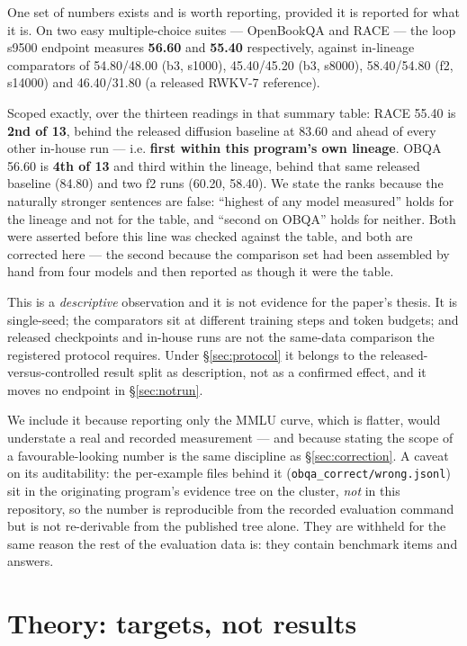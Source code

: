 \documentclass[11pt]{article}
\begin{document}
One set of numbers exists and is worth reporting, provided it is reported for what it
is. On two easy multiple-choice suites --- OpenBookQA and RACE --- the loop s9500
endpoint measures \textbf{56.60} and \textbf{55.40} respectively, against in-lineage
comparators of 54.80/48.00 (b3, s1000), 45.40/45.20 (b3, s8000), 58.40/54.80 (f2,
s14000) and 46.40/31.80 (a released RWKV-7 reference).

Scoped exactly, over the thirteen readings in that summary table: RACE 55.40 is
\textbf{2nd of 13}, behind the released diffusion baseline at 83.60 and ahead of every
other in-house run --- i.e. \textbf{first within this program's own lineage}. OBQA 56.60
is \textbf{4th of 13} and third within the lineage, behind that same released baseline
(84.80) and two f2 runs (60.20, 58.40). We state the ranks because the naturally
stronger sentences are false: ``highest of any model measured'' holds for the lineage
and not for the table, and ``second on OBQA'' holds for neither. Both were asserted
before this line was checked against the table, and both are corrected here --- the
second because the comparison set had been assembled by hand from four models and then
reported as though it were the table.

This is a \emph{descriptive} observation and it is not evidence for the paper's thesis.
It is single-seed; the comparators sit at different training steps and token budgets;
and released checkpoints and in-house runs are not the same-data comparison the
registered protocol requires. Under \S\ref{sec:protocol} it belongs to the
released-versus-controlled result split as description, not as a confirmed effect, and
it moves no endpoint in \S\ref{sec:notrun}.

We include it because reporting only the MMLU curve, which is flatter, would understate
a real and recorded measurement --- and because stating the scope of a favourable-looking
number is the same discipline as \S\ref{sec:correction}. A caveat on its auditability:
the per-example files behind it (\texttt{obqa\_correct/wrong.jsonl}) sit in the
originating program's evidence tree on the cluster, \emph{not} in this repository, so
the number is reproducible from the recorded evaluation command but is not re-derivable
from the published tree alone. They are withheld for the same reason the rest of the
evaluation data is: they contain benchmark items and answers.

\section{Theory: targets, not results}
\label{sec:theory}
\end{document}
